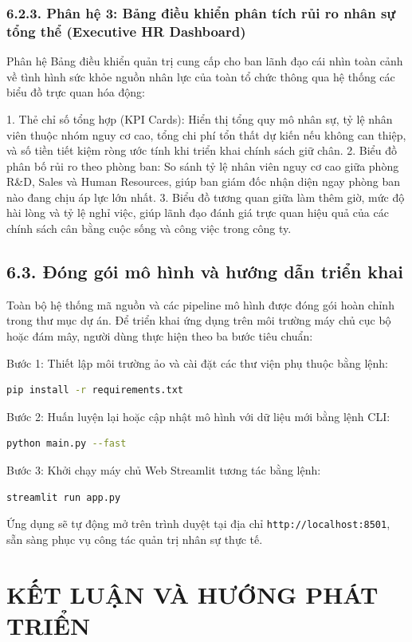 \documentclass[12pt,a4paper]{article}
\begin{document}
\subsubsection{6.2.3. Phân hệ 3: Bảng điều khiển phân tích rủi ro nhân sự tổng thể (Executive HR Dashboard)}
Phân hệ Bảng điều khiển quản trị cung cấp cho ban lãnh đạo cái nhìn toàn cảnh về tình hình sức khỏe nguồn nhân lực của toàn tổ chức thông qua hệ thống các biểu đồ trực quan hóa động:

1. Thẻ chỉ số tổng hợp (KPI Cards): Hiển thị tổng quy mô nhân sự, tỷ lệ nhân viên thuộc nhóm nguy cơ cao, tổng chi phí tổn thất dự kiến nếu không can thiệp, và số tiền tiết kiệm ròng ước tính khi triển khai chính sách giữ chân.
2. Biểu đồ phân bố rủi ro theo phòng ban: So sánh tỷ lệ nhân viên nguy cơ cao giữa phòng R\&D, Sales và Human Resources, giúp ban giám đốc nhận diện ngay phòng ban nào đang chịu áp lực lớn nhất.
3. Biểu đồ tương quan giữa làm thêm giờ, mức độ hài lòng và tỷ lệ nghỉ việc, giúp lãnh đạo đánh giá trực quan hiệu quả của các chính sách cân bằng cuộc sống và công việc trong công ty.

\subsection{6.3. Đóng gói mô hình và hướng dẫn triển khai}
Toàn bộ hệ thống mã nguồn và các pipeline mô hình được đóng gói hoàn chỉnh trong thư mục dự án. Để triển khai ứng dụng trên môi trường máy chủ cục bộ hoặc đám mây, người dùng thực hiện theo ba bước tiêu chuẩn:

Bước 1: Thiết lập môi trường ảo và cài đặt các thư viện phụ thuộc bằng lệnh:
\begin{lstlisting}[language=bash]
pip install -r requirements.txt
\end{lstlisting}

Bước 2: Huấn luyện lại hoặc cập nhật mô hình với dữ liệu mới bằng lệnh CLI:
\begin{lstlisting}[language=bash]
python main.py --fast
\end{lstlisting}

Bước 3: Khởi chạy máy chủ Web Streamlit tương tác bằng lệnh:
\begin{lstlisting}[language=bash]
streamlit run app.py
\end{lstlisting}
Ứng dụng sẽ tự động mở trên trình duyệt tại địa chỉ \texttt{http://localhost:8501}, sẵn sàng phục vụ công tác quản trị nhân sự thực tế.

\newpage
\section{KẾT LUẬN VÀ HƯỚNG PHÁT TRIỂN}
\end{document}
